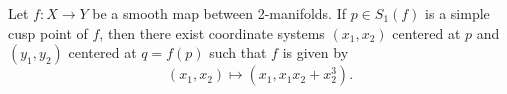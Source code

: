 Let $f: X \to Y$ be a smooth map between 2-manifolds. If $p \in S_1(f)$ is a simple cusp point of $f$, then there exist coordinate systems $(x_1, x_2)$ centered at $p$ and $(y_1, y_2)$ centered at $q = f(p)$ such that $f$ is given by
$$(x_1, x_2) \mapsto (x_1, x_1x_2 + x_2^3).$$

